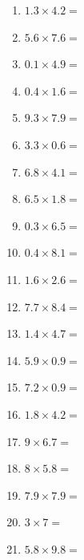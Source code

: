 \documentclass[12pt]{article}
\begin{document}
\begin{enumerate}
\item \large $ 1.3 \times 4.2 = $ \vspace{1.5cm}
\newpage
\item \large $ 5.6 \times 7.6 = $ \vspace{1.5cm}
\item \large $ 0.1 \times 4.9 = $ \vspace{1.5cm}
\item \large $ 0.4 \times 1.6 = $ \vspace{1.5cm}
\item \large $ 9.3 \times 7.9 = $ \vspace{1.5cm}
\item \large $ 3.3 \times 0.6 = $ \vspace{1.5cm}
\item \large $ 6.8 \times 4.1 = $ \vspace{1.5cm}
\item \large $ 6.5 \times 1.8 = $ \vspace{1.5cm}
\item \large $ 0.3 \times 6.5 = $ \vspace{1.5cm}
\item \large $ 0.4 \times 8.1 = $ \vspace{1.5cm}
\item \large $ 1.6 \times 2.6 = $ \vspace{1.5cm}
\newpage
\item \large $ 7.7 \times 8.4 = $ \vspace{1.5cm}
\item \large $ 1.4 \times 4.7 = $ \vspace{1.5cm}
\item \large $ 5.9 \times 0.9 = $ \vspace{1.5cm}
\item \large $ 7.2 \times 0.9 = $ \vspace{1.5cm}
\item \large $ 1.8 \times 4.2 = $ \vspace{1.5cm}
\item \large $ 9 \times 6.7 = $ \vspace{1.5cm}
\item \large $ 8 \times 5.8 = $ \vspace{1.5cm}
\item \large $ 7.9 \times 7.9 = $ \vspace{1.5cm}
\item \large $ 3 \times 7 = $ \vspace{1.5cm}
\item \large $ 5.8 \times 9.8 = $ \vspace{1.5cm}

\end{enumerate}
\end{document}
